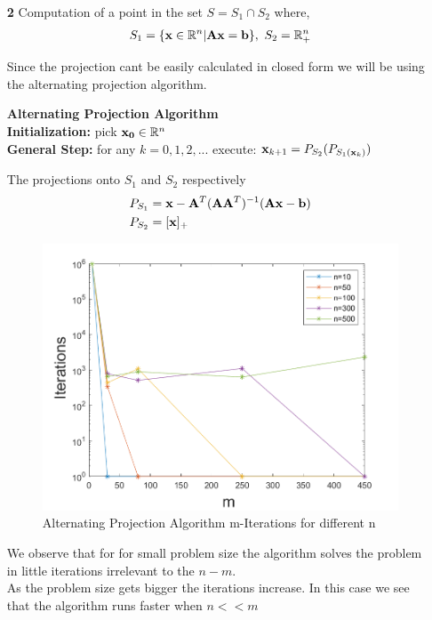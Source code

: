 \documentclass[12pt]{article}
\begin{document}
\begin{enumerate}
			\newpage
		\item[\bf 2] Computation of a point in the set $S=S_1\cap S_2$ where,
		\begin{align*}
			S_1 = \{ {\bf x}\in\mathbb{R}^n | {\bf A}{\bf x}={\bf b} \}, \ S_2=\mathbb{R}^n_+
		\end{align*}
		
		Since the projection cant be easily calculated in closed form we will be using the alternating projection algorithm. 
		
		\begin{tcolorbox}
			{\bf Alternating Projection Algorithm}\\
			{\bf Initialization:} pick ${\bf x_0}\in\mathbb{R}^n$\\
			
			{\bf General Step:} for any $k=0,1,2,...$ execute: ${\bf x}_{k+1}=P_{S_2}(P_{S_1({\bf x}_k)})$
		\end{tcolorbox}
		The projections onto $S_1$ and $S_2$ respectively
		\begin{align*}
			&P_{S_1} = {\bf x}-{\bf A}^T({\bf A}{\bf A}^T)^{-1}({\bf A}{\bf x}-{\bf b})\\
			&P_{S_2} = [{\bf x}]_+	
		\end{align*}
		\begin{figure}[h]
			\centering
			\includegraphics[width=\textwidth]{P2-fig2.png}
			\caption{Alternating Projection Algorithm m-Iterations for different n}
		\end{figure}
		
		We observe that for for small problem size the algorithm solves the problem in little iterations irrelevant to the $n-m$.\\
		As the problem size gets bigger the iterations increase. In this case we see that the algorithm runs faster when $n<<m$
		

\end{enumerate}
\end{document}
